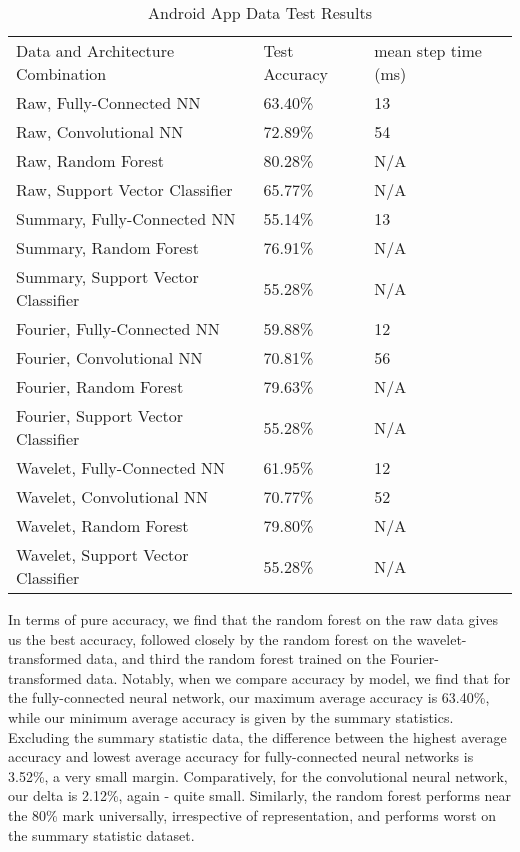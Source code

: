 \begin{table}[ht]
\caption{Android App Data Test Results}
\centering
\label{Tab:test}	
\begin{tabular}{lll}
Data and Architecture Combination & Test Accuracy & mean step time (ms) \\
Raw, Fully-Connected NN            & 63.40\%         & 13\\
Raw, Convolutional NN              & 72.89\%         & 54\\
Raw, Random Forest                 & 80.28\%         & N/A\\ 
Raw, Support Vector Classifier     & 65.77\%         & N/A\\    
Summary, Fully-Connected NN        & 55.14\%         & 13\\
Summary, Random Forest             & 76.91\%         & N/A\\
Summary, Support Vector Classifier & 55.28\%         & N/A\\  
Fourier, Fully-Connected NN        & 59.88\%         & 12\\
Fourier, Convolutional NN          & 70.81\%         & 56\\
Fourier, Random Forest             & 79.63\%         & N/A\\
Fourier, Support Vector Classifier & 55.28\%         & N/A\\  
Wavelet, Fully-Connected NN        & 61.95\%         & 12\\
Wavelet, Convolutional NN          & 70.77\%         & 52\\
Wavelet, Random Forest             & 79.80\%         & N/A\\
Wavelet, Support Vector Classifier & 55.28\%         & N/A           
\end{tabular}
\end{table}

In terms of pure accuracy, we find that the random forest on the raw data gives us the best accuracy, followed closely by the random forest on the wavelet-transformed data, and third the random forest trained on the Fourier-transformed data. 
Notably, when we compare accuracy by model, we find that for the fully-connected neural network, our maximum average accuracy is 63.40\%, while our minimum average accuracy is given by the summary statistics.
Excluding the summary statistic data, the difference between the highest average accuracy and lowest average accuracy for fully-connected neural networks is 3.52\%, a very small margin. 
Comparatively, for the convolutional neural network, our delta is 2.12\%, again - quite small. 
Similarly, the random forest performs near the 80\% mark universally, irrespective of representation, and performs worst on the summary statistic dataset. 
